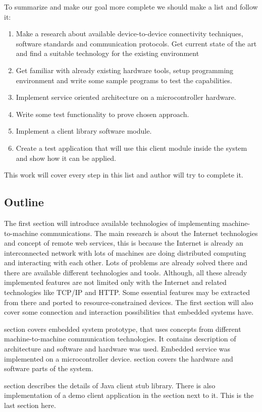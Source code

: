 To summarize and make our goal more complete we should make a list and follow
it:
\begin{enumerate}
  \item Make a research about available device-to-device connectivity
  techniques, software standards and communication protocols. Get current state
  of the art and find a suitable technology for the existing environment
  \item Get familiar with already existing hardware tools, setup programming
  environment and write some sample programs to test the capabilities.
  \item Implement service oriented architecture on a microcontroller hardware.
  \item Write some test functionality to prove chosen approach.
  \item Implement a client library software module.
  \item Create a test application that will use this client module inside the
  system and show how it can be applied. 
\end{enumerate}

This work will cover every step in this list and author will try to complete it. 

\subsection{Outline}

The first section will introduce available technologies of implementing
machine-to-machine communications. 
The main research is about the Internet technologies and concept of remote web services, this is because the Internet
is already an interconnected network with lots of machines are doing distributed
computing and interacting with each other. 
Lots of problems are already solved there and there are available different technologies and tools.
Although, all these already implemented features are not limited  only with the
Internet and related technologies like \gls{TCP}/IP and HTTP. 
Some essential features may be extracted from there and ported to resource-constrained devices.
The first section will also cover some connection and interaction possibilities that embedded systems have.

 section covers embedded system prototype, that uses
concepts from different machine-to-machine communication technologies. It
contains description of architecture and software and hardware was used. 
Embedded service was implemented on a microcontroller device. 
 section covers the hardware and software parts of the system.

 section describes the details of Java client stub library.
There is also implementation of a demo client application  in the section next to it. 
This is the last section here.


